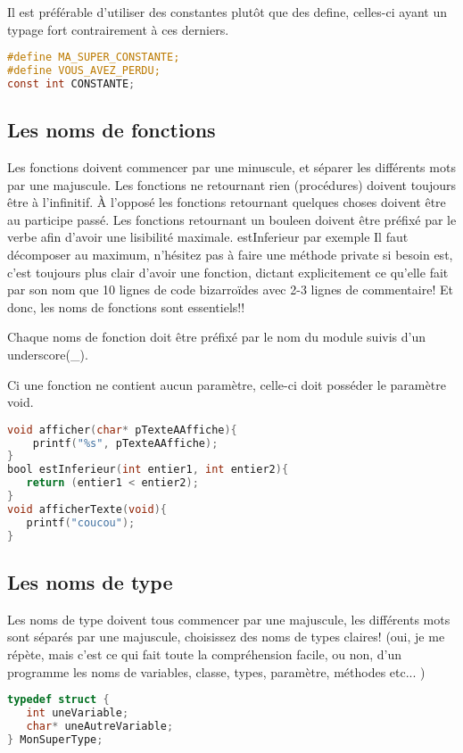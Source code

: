 Il est préférable d'utiliser des constantes plutôt que des define, celles-ci ayant un typage fort contrairement à ces derniers.

\begin{lstlisting}[language=C, caption=Exemples de noms de constantes]
#define MA_SUPER_CONSTANTE;
#define VOUS_AVEZ_PERDU;
const int CONSTANTE;
\end{lstlisting}

\subsection{Les noms de fonctions}
Les fonctions doivent commencer par une minuscule, et séparer les différents mots par une majuscule. Les fonctions ne retournant rien (procédures) doivent toujours être à l'infinitif. 
À l'opposé les fonctions retournant quelques choses doivent être au participe passé. 
Les fonctions retournant un bouleen doivent être préfixé par le verbe afin d'avoir une lisibilité maximale. estInferieur par exemple
Il faut décomposer au maximum, n'hésitez pas à faire une méthode private si besoin est, c'est toujours plus clair d'avoir une fonction, dictant explicitement ce qu'elle fait par son nom que 10 lignes de code bizarroïdes avec 2-3 lignes de commentaire! Et donc, les noms de fonctions sont essentiels!! 

Chaque noms de fonction doit être préfixé par le nom du module suivis d'un underscore(\_).

Ci une fonction ne contient aucun paramètre, celle-ci doit posséder le paramètre void.
\begin{lstlisting}[language=C, caption=Exemple de fonctions]
void afficher(char* pTexteAAffiche){
    printf("%s", pTexteAAffiche);
}
bool estInferieur(int entier1, int entier2){
   return (entier1 < entier2);
}
void afficherTexte(void){
   printf("coucou");
}
\end{lstlisting}

\subsection{Les noms de type}
Les noms de type doivent tous commencer par une majuscule, les différents mots sont séparés par une majuscule, choisissez des noms de types claires! 
(oui, je me répète, mais c'est ce qui fait toute la compréhension facile, ou non, d'un programme les noms de variables, classe, types, paramètre, méthodes etc... )

\begin{lstlisting}[language=C]
typedef struct {
   int uneVariable;
   char* uneAutreVariable;
} MonSuperType;
\end{lstlisting}

